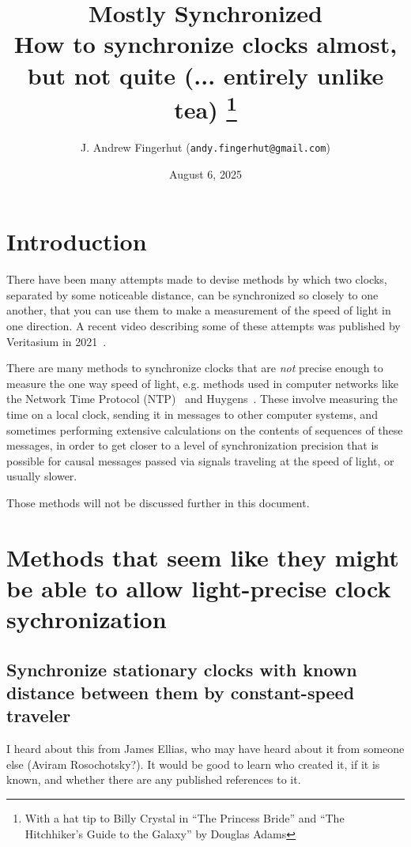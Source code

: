 \documentclass[a4paper]{article}
\title{
  Mostly Synchronized \\
  \large How to synchronize clocks almost, but not quite (... entirely
  unlike tea)
  \footnote{With a hat tip to Billy Crystal in ``The Princess Bride'' and ``The Hitchhiker's Guide to the Galaxy'' by Douglas Adams}}
\author{J. Andrew Fingerhut (\texttt{andy.fingerhut@gmail.com})}
\date{
        August 6, 2025
}
\theoremstyle{plain}
\theoremstyle{definition}
\begin{document}
\maketitle


\tableofcontents

\section{Introduction}
\label{sec:intro}

There have been many attempts made to devise methods by which two
clocks, separated by some noticeable distance, can be synchronized so
closely to one another, that you can use them to make a measurement of
the speed of light in one direction.  A recent video describing some
of these attempts was published by Veritasium in
2021~\cite{OneWaySpeedOfLight}.

There are many methods to synchronize clocks that are {\em not}
precise enough to measure the one way speed of light, e.g. methods
used in computer networks like the Network Time Protocol
(NTP)~\cite{NetworkTimeProtocol} and {\sc Huygens}~\cite{GLYN2018}.
These involve measuring the time on a local clock, sending it in
messages to other computer systems, and sometimes performing extensive
calculations on the contents of sequences of these messages, in order
to get closer to a level of synchronization precision that is possible
for causal messages passed via signals traveling at the speed of
light, or usually slower.

Those methods will not be discussed further in this document.


\section{Methods that seem like they might be able to allow light-precise clock sychronization}

\subsection{Synchronize stationary clocks with known distance between them by constant-speed traveler}

I heard about this from James Ellias, who may have heard about it from
someone else (Aviram Rosochotsky?).  It would be good to learn who
created it, if it is known, and whether there are any published
references to it.
\end{document}
